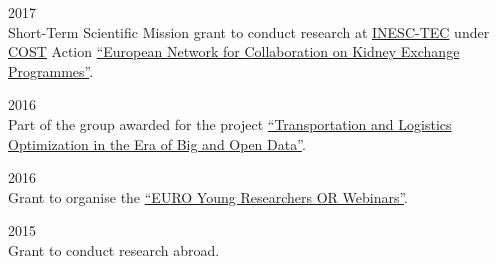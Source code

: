 \begin{paracol}{2}
  \textsc{2017}
\switchcolumn
  \\
  Short-Term Scientific Mission grant to conduct research at \href{https://www.inesctec.pt/}{INESC-TEC} under \href{http://www.cost.eu/}{COST} Action \href{http://www.enckep-cost.eu/}{``European Network for Collaboration on Kidney Exchange Programmes''}.
\end{paracol}

\begin{paracol}{2}
  \textsc{2016}
\switchcolumn
  \\
  Part of the group awarded for the project \href{https://santini.in/files/cv/prin16.pdf}{``Transportation and Logistics Optimization in the Era of Big and Open Data''}.
\end{paracol}

\begin{paracol}{2}
  \textsc{2016}
\switchcolumn
  \\
  Grant to organise the \href{https://www.airoyoung.org/resources/euro-seminars}{``EURO Young Researchers OR Webinars''}.
\end{paracol}

\begin{paracol}{2}
  \textsc{2015}
\switchcolumn
  \\
  Grant to conduct research abroad.
\end{paracol}
